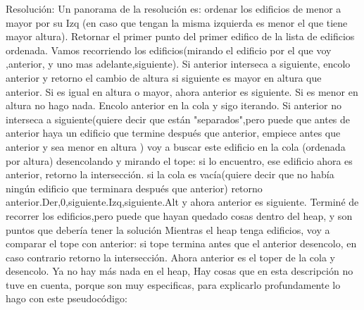 \documentclass{article}
\begin{document}
\newpage

{\noindent \Huge Resoluci\'on:}
\newline \newline
Un panorama de la resolución es:\newline
ordenar los edificios de menor a mayor por su Izq (en caso que tengan la misma izquierda es menor el que tiene mayor altura). \newline
Retornar el primer punto del primer edifico de la lista de edificios ordenada. \newline
Vamos recorriendo los edificios(mirando el edificio por el que voy ,anterior, y uno mas adelante,siguiente).\newline
Si anterior interseca a siguiente, encolo anterior y retorno el cambio de altura si siguiente es mayor en altura que anterior.\newline
Si es igual en altura o mayor, ahora anterior es siguiente. Si es menor en altura no hago nada. \color{red}{no vale la pena ponerlo} \newline \color{black}{}
Encolo anterior en la cola y sigo iterando.
Si anterior no interseca a siguiente(quiere decir que están "separados",pero puede que antes de anterior haya un edificio que termine después que anterior, empiece antes que anterior y sea menor en altura )
voy a buscar este edificio en la cola (ordenada por altura) desencolando y mirando el tope:\newline
si lo encuentro, ese edificio ahora es anterior, retorno la intersección.\newline
si la cola es vacía(quiere decir que no había ningún edificio que terminara después que anterior) retorno anterior.Der,0,siguiente.Izq,siguiente.Alt y ahora anterior es siguiente.
\newline
Terminé de recorrer los edificios,pero puede que hayan quedado cosas dentro del heap, y son puntos que debería tener la solución
Mientras el heap tenga edificios, voy a comparar el tope con anterior:\newline
si tope termina antes que el anterior desencolo, en caso contrario retorno la intersección. 
Ahora anterior es el toper de la cola y desencolo.\newline
Ya no hay más nada en el heap, \color{red}{mirar} \color{black}
\newline
Hay cosas que en esta descripción no tuve en cuenta, porque son muy especificas, para explicarlo profundamente lo hago con este pseudocódigo: 
\newline
 
\end{document}
